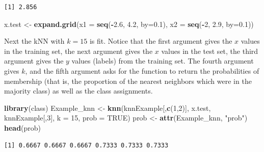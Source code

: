 \documentclass[
]{krantz}
\makeatletter
\newenvironment{Shaded}{\begin{snugshade}}{\end{snugshade}}
\newcommand{\DataTypeTok}[1]{\textcolor[rgb]{0.27,0.27,0.27}{#1}}
\newcommand{\DecValTok}[1]{\textcolor[rgb]{0.06,0.06,0.06}{#1}}
\newcommand{\FloatTok}[1]{\textcolor[rgb]{0.06,0.06,0.06}{#1}}
\newcommand{\KeywordTok}[1]{\textcolor[rgb]{0.27,0.27,0.27}{\textbf{#1}}}
\newcommand{\NormalTok}[1]{#1}
\newcommand{\OperatorTok}[1]{\textcolor[rgb]{0.43,0.43,0.43}{\textbf{#1}}}
\newcommand{\OtherTok}[1]{\textcolor[rgb]{0.37,0.37,0.37}{#1}}
\newcommand{\StringTok}[1]{\textcolor[rgb]{0.5,0.5,0.5}{#1}}
\newenvironment{kframe}{%
\medskip{}
\setlength{\fboxsep}{.8em}
 \def\at@end@of@kframe{}%
 \ifinner\ifhmode%
  \def\at@end@of@kframe{\end{minipage}}%
  \begin{minipage}{\columnwidth}%
 \fi\fi%
 \def\FrameCommand##1{\hskip\@totalleftmargin \hskip-\fboxsep
 \colorbox{shadecolor}{##1}\hskip-\fboxsep
     \hskip-\linewidth \hskip-\@totalleftmargin \hskip\columnwidth}%
 \MakeFramed {\advance\hsize-\width
   \@totalleftmargin\z@ \linewidth\hsize
   \@setminipage}}%
 {\par\unskip\endMakeFramed%
 \at@end@of@kframe}
\renewenvironment{Shaded}{\begin{kframe}}{\end{kframe}}
\makeatother
\begin{document}
\begin{Shaded}
\end{Shaded}

\begin{verbatim}
[1] 2.856
\end{verbatim}

\begin{Shaded}
\begin{Highlighting}[]
\NormalTok{x.test \textless{}{-}}\StringTok{ }\KeywordTok{expand.grid}\NormalTok{(}\DataTypeTok{x1 =} \KeywordTok{seq}\NormalTok{(}\OperatorTok{{-}}\FloatTok{2.6}\NormalTok{, }\FloatTok{4.2}\NormalTok{, }\DataTypeTok{by=}\FloatTok{0.1}\NormalTok{), }\DataTypeTok{x2 =} \KeywordTok{seq}\NormalTok{(}\OperatorTok{{-}}\DecValTok{2}\NormalTok{, }\FloatTok{2.9}\NormalTok{, }\DataTypeTok{by=}\FloatTok{0.1}\NormalTok{))}
\end{Highlighting}
\end{Shaded}

Next the kNN with \(k=15\) is fit. Notice that the first argument gives the \(x\) values in the training set, the next argument gives the \(x\) values in the test set, the third argument gives the \(y\) values (labels) from the training set. The fourth argument gives \(k\), and the fifth argument asks for the function to return the probabilities of membership (that is, the proportion of the nearest neighbors which were in the majority class) as well as the class assignments.

\begin{Shaded}
\begin{Highlighting}[]
\KeywordTok{library}\NormalTok{(class)}
\NormalTok{Example\_knn \textless{}{-}}\StringTok{ }\KeywordTok{knn}\NormalTok{(knnExample[,}\KeywordTok{c}\NormalTok{(}\DecValTok{1}\NormalTok{,}\DecValTok{2}\NormalTok{)], x.test, knnExample[,}\DecValTok{3}\NormalTok{], }\DataTypeTok{k =} \DecValTok{15}\NormalTok{, }\DataTypeTok{prob =} \OtherTok{TRUE}\NormalTok{)}
\NormalTok{prob \textless{}{-}}\StringTok{ }\KeywordTok{attr}\NormalTok{(Example\_knn, }\StringTok{"prob"}\NormalTok{)}
\KeywordTok{head}\NormalTok{(prob)}
\end{Highlighting}
\end{Shaded}

\begin{verbatim}
[1] 0.6667 0.6667 0.6667 0.7333 0.7333 0.7333
\end{verbatim}
\end{document}
